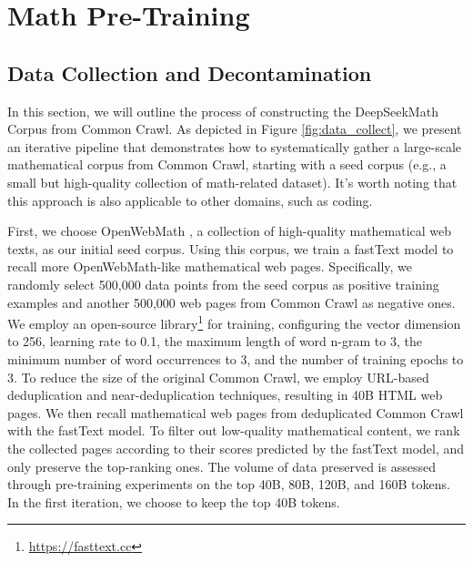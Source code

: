 \section{Math Pre-Training}

\subsection{Data Collection and Decontamination}
In this section, we will outline the process of constructing the DeepSeekMath Corpus from Common Crawl.
As depicted in Figure \ref{fig:data_collect}, we present an iterative pipeline that demonstrates how to systematically gather a large-scale mathematical corpus from Common Crawl, starting with a seed corpus (e.g., a small but high-quality collection of math-related dataset).
It's worth noting that this approach is also applicable to other domains, such as coding.
 

First, we choose OpenWebMath \citep{openwebmath}, a collection of high-quality mathematical web texts, as our initial seed corpus.
Using this corpus, we train a fastText model \citep{joulin2016fasttext} to recall more OpenWebMath-like mathematical web pages.
Specifically, we randomly select 500,000 data points from the seed corpus as positive training examples and another 500,000 web pages from Common Crawl as negative ones.
We employ an open-source library\footnote{\url{https://fasttext.cc}} for training, configuring the vector dimension to 256, learning rate to 0.1, the maximum length of word n-gram to 3, the minimum number of word occurrences to 3, and the number of training epochs to 3.
To reduce the size of the original Common Crawl, we employ URL-based deduplication and near-deduplication techniques, resulting in 40B HTML web pages.
We then recall mathematical web pages from deduplicated Common Crawl with the fastText model.
To filter out low-quality mathematical content, we rank the collected pages according to their scores predicted by the fastText model, and only preserve the top-ranking ones.
The volume of data preserved is assessed through pre-training experiments on the top 40B, 80B, 120B, and 160B tokens.
In the first iteration, we choose to keep the top 40B tokens.

